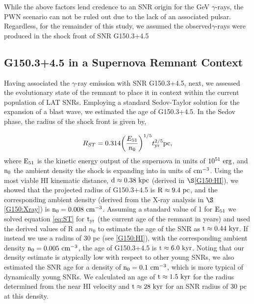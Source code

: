 \documentclass[iop]{emulateapj}
\newcommand{\kibitz}[2]{\ifnum\Comments=1\textcolor{#1}{#2}\fi}
\newcommand{\jamie}[1]{\kibitz{red}      {[JAM: #1]}}
\newcommand{\gam}{$\gamma$-ray}
\newcommand{\Gone}{G150.3+4.5}
\begin{document}
While the above factors lend credence to an SNR origin for the GeV \gam{}s, the PWN  scenario can not be ruled out due to the lack of an associated pulsar. Regardless, for the remainder of this study, we assumed the observed\gam{}s were produced in the shock front of SNR \Gone{}

\subsection{\Gone{} in a Supernova Remnant Context }\label{G150:SNRevo}

Having associated the \gam{} emission with SNR \Gone{}, next, we assessed the evolutionary state of the remnant to place it in context within the current population of LAT SNRs. Employing a standard Sedov-Taylor solution for the expansion of a blast wave, we estimated the age of \Gone{}. In the Sedov phase, the radius of the shock front is given by,


\begin{equation} \label{eq:ST}
	R_{ST} = 0.314 \bigg{(}\frac{E_{51}}{n_0} \bigg{)}^{1/5} t_{{\rm yr}}^{2/5} {\rm  pc},
\end{equation}
where ${\rm E_{51}}$ is the kinetic energy output of the  supernova in units of ${\rm 10^{51}~erg}$, and ${\rm n_0}$ the ambient density the shock is expanding into in units of ${\rm cm^{-3}}$. Using the most viable HI kinematic distance, ${\rm d  \approx 0.38~kpc}$ (derived in $\S$\ref{G150:HI}), we showed that the projected radius of \Gone{} is ${\rm R \approx 9.4~pc}$, and the corresponding ambient density (derived from the X-ray analysis in $\S$\ref{G150:Xray}) is ${\rm n_0 = 0.008~cm^{-3}}$. Assuming a standard value of 1 for ${\rm E_{51}}$  we solved equation \ref{eq:ST} for ${\rm t_{yr}}$ (the current age of the remnant in years) and used the derived values of R and $n_0$ to estimate the age of the SNR as ${\rm t \approx 0.44~kyr}$. If instead we use a radius of 30 pc (see \ref{G150:HI}), with the corresponding ambient density ${\rm n_0 = 0.005~cm^{-3}}$, the age of \Gone{} is ${\rm t \approx 6.0~kyr}$. Noting that our density estimate is atypically low with respect to other young SNRs, we also estimated the SNR age for a density of ${\rm n_0 = 0.1~cm^{-3}}$, which is more typical of dynamically young SNRs.  We calculated an age of ${\rm t \approx 1.5~kyr}$ for the radius determined from the near HI velocity and ${\rm t \approx 28~kyr}$ for an SNR radius of 30 pc at this density.
\end{document}
